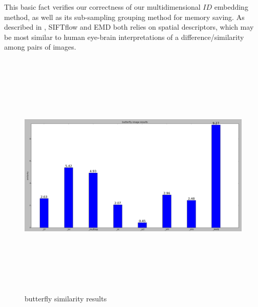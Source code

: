 		
		
This basic fact verifies our correctness of our multidimensional $ID$ embedding method, as well as its sub-sampling grouping method for memory saving.
As described in \cite{retargeting}, SIFTflow \cite{siftflow} and EMD \cite{EMD} both relies on spatial descriptors, which may be most similar to human eye-brain interpretations of a difference/similarity among pairs of images. \\
		
		
		\begin{figure}[h] \label{bf_id}
			\includegraphics[width=\linewidth,height=12cm,keepaspectratio]{Figures/bf_id}
			\caption[butterfly similarity results]
			{butterfly similarity results}
		\end{figure}
		
